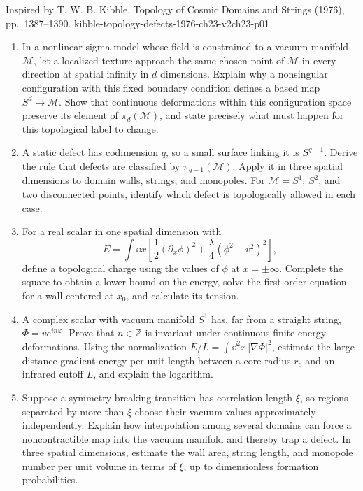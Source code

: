 
\begin{enumerate}
  {Inspired by T. W. B. Kibble, Topology of Cosmic Domains and
  Strings (1976), pp.~1387--1390.}
  {kibble-topology-defects-1976-ch23-v2ch23-p01}
  \begin{enumerate}
    \item[(a)]
    In a nonlinear sigma model whose field is constrained to a vacuum
    manifold \(\mathcal M\), let a localized texture approach the same chosen
    point of \(\mathcal M\) in every direction at spatial infinity in
    \(d\) dimensions.  Explain why a nonsingular configuration with
    this fixed boundary condition defines a based map
    \(S^d\to\mathcal M\).  Show that continuous deformations within this
    configuration space preserve its element of \(\pi_d(\mathcal M)\),
    and state precisely what must happen for this topological label to
    change.
    \item[(b)]
    A static defect has codimension \(q\), so a small surface linking it is
    \(S^{q-1}\).  Derive the rule that defects are classified by
    \(\pi_{q-1}(\mathcal M)\).  Apply it in three spatial dimensions to
    domain walls, strings, and monopoles.  For
    \(\mathcal M=S^1\), \(S^2\), and two disconnected points, identify
    which defect is topologically allowed in each case.
    \item[(c)]
    For a real scalar in one spatial dimension with
    \[
      E=\int \dd x\left[
         \frac12(\partial_x\phi)^2+
         \frac\lambda4(\phi^2-v^2)^2\right],
    \]
    define a topological charge using the values of \(\phi\) at
    \(x=\pm\infty\).  Complete the square to obtain a lower bound on the
    energy, solve the first-order equation for a wall centered at \(x_0\),
    and calculate its tension.
    \item[(d)]
    A complex scalar with vacuum manifold \(S^1\) has, far from a straight
    string, \(\Phi=v e^{in\varphi}\).  Prove that \(n\in\mathbb Z\) is
    invariant under continuous finite-energy deformations.  Using the
    normalization
    \(E/L=\int \dd^2x\,\lvert\nabla\Phi\rvert^2\), estimate the
    large-distance gradient energy per unit length between a core radius
    \(r_c\) and an infrared cutoff \(L\), and explain the logarithm.
    \item[(e)]
    Suppose a symmetry-breaking transition has correlation length
    \(\xi\), so regions separated by more than \(\xi\) choose their vacuum
    values approximately independently.  Explain how interpolation among
    several domains can force a noncontractible map into the vacuum
    manifold and thereby trap a defect.  In three spatial dimensions,
    estimate the wall area, string length, and monopole number per unit
    volume in terms of \(\xi\), up to dimensionless formation
    probabilities.
  \end{enumerate}


\end{enumerate}
